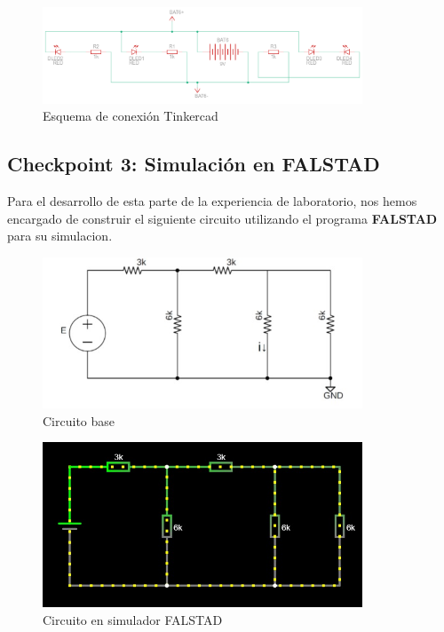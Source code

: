 \documentclass{article}
\begin{document}
\begin{figure}[H]
    \centering
    \includegraphics[width=0.85\textwidth]{./img/ckpt_2_3_2.png}
    \caption{Esquema de conexión Tinkercad}
    \label{fig:simulacion_esquema1}
\end{figure}

\subsection{Checkpoint 3: Simulación en FALSTAD}
Para el desarrollo de esta parte de la experiencia de laboratorio, nos hemos encargado de construir el siguiente circuito utilizando el programa \textbf{FALSTAD} para su simulacion.

\begin{figure}[H]
    \centering
    \includegraphics[width=0.85\textwidth]{./img/Circuito-3.jpeg}
    \caption{Circuito base}
    \label{fig:simulacion_esquema2}
\end{figure}

\begin{figure}[H]
    \centering
    \includegraphics[width=0.85\textwidth]{./img/Falstad.jpeg}
    \caption{Circuito en simulador FALSTAD}
    \label{fig:simulacion_esquema3}
\end{figure}
\end{document}
